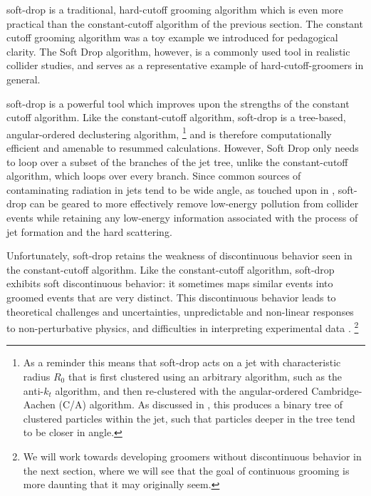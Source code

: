 \Gls{soft-drop} \cite{Larkoski:2014wba} is a traditional, hard-cutoff grooming algorithm which is even more practical than the \gls{constant-cutoff} algorithm of the previous section.
%
The constant cutoff grooming algorithm was a toy example we introduced for pedagogical clarity.
%
The Soft Drop algorithm, however, is a commonly used tool in realistic collider studies, and serves as a representative example of \glspl{hard-cutoff-groomer} in general.

\gls{soft-drop} is a powerful tool which improves upon the strengths of the constant cutoff algorithm.
%
Like the \gls{constant-cutoff} algorithm, \gls{soft-drop} is a tree-based, angular-ordered \gls{declustering} algorithm,%
\footnote{
    As a reminder this means that \gls{soft-drop} acts on a jet with characteristic radius \(R_0\) that is first clustered using an arbitrary algorithm, such as the anti-\(k_t\) algorithm, and then re-clustered with the angular-ordered Cambridge-Aachen (C/A) algorithm.
    As discussed in , this produces a binary tree of clustered particles within the jet, such that particles deeper in the tree tend to be closer in angle.
}
%
and is therefore computationally efficient and amenable to resummed calculations.
%
However, Soft Drop only needs to loop over a subset of the branches of the jet tree, unlike the \gls{constant-cutoff} algorithm, which loops over every branch.
%
Since common sources of contaminating radiation in jets tend to be wide angle, as touched upon in , \gls{soft-drop} can be geared to more effectively remove low-energy pollution from collider events while retaining any low-energy information associated with the process of jet formation and the hard scattering.

Unfortunately, \gls{soft-drop} retains the weakness of discontinuous behavior seen in the \gls{constant-cutoff} algorithm.
%
Like the \gls{constant-cutoff} algorithm, \gls{soft-drop} exhibits soft discontinuous behavior:
%
it sometimes maps similar events into groomed events that are very distinct.
%
This discontinuous behavior leads to theoretical challenges and uncertainties, unpredictable and non-linear responses to non-perturbative physics, and difficulties in interpreting experimental data \cite{ATL-PHYS-PUB-2019-027,Aad:2019vyi,ATLAS:2020gwe}.%
\footnote{
    We will work towards developing groomers without discontinuous behavior in the next section, where we will see that the goal of continuous grooming is more daunting that it may originally seem.
}


